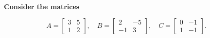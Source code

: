 \providecommand{\rank}{\operatorname{r}}
\providecommand{\RR}{\mathbb R}
\providecommand{\CC}{\mathbb C}
\providecommand{\KK}{\mathbb K}

\setcounter{enumi}{19}
\item {\bfseries\boldmath
Consider the matrices
}

\[
A=\begin{bmatrix}3&5\\1&2\end{bmatrix},\quad B=\begin{bmatrix}2&-5\\-1&3\end{bmatrix},\quad C=\begin{bmatrix}0&-1\\1&-1\end{bmatrix}.
\]


